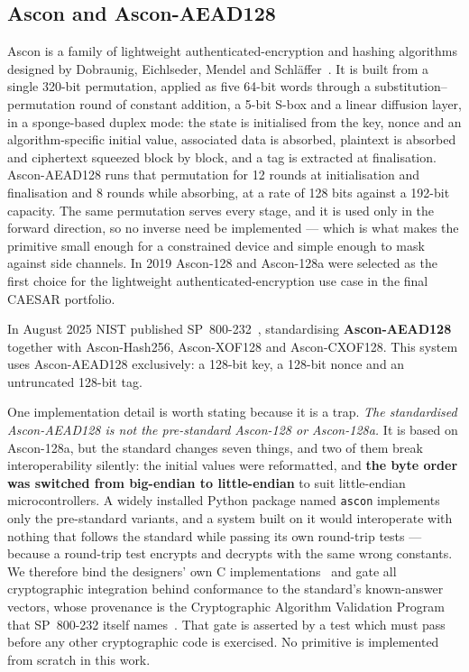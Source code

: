 \documentclass[conference]{IEEEtran}
\begin{document}
\subsection{Ascon and Ascon-AEAD128}\label{sec:ascon}
Ascon is a family of lightweight authenticated-encryption and hashing algorithms designed by
Dobraunig, Eichlseder, Mendel and Schl\"affer~\cite{dobraunig2021ascon}. It is built from a
single 320-bit permutation, applied as five 64-bit words through a substitution--permutation
round of constant addition, a 5-bit S-box and a linear diffusion layer, in a sponge-based duplex
mode: the state is initialised from the key, nonce and an algorithm-specific initial value,
associated data is absorbed, plaintext is absorbed and ciphertext squeezed block by block, and a
tag is extracted at finalisation. Ascon-AEAD128 runs that permutation for 12 rounds at
initialisation and finalisation and 8 rounds while absorbing, at a rate of 128 bits against a
192-bit capacity. The same permutation serves every stage, and it is used only in the forward
direction, so no inverse need be implemented --- which is what makes the primitive small enough
for a constrained device and simple enough to mask against side channels. In 2019 Ascon-128 and
Ascon-128a were selected as the first choice for the lightweight authenticated-encryption use
case in the final CAESAR portfolio.

In August 2025 NIST published SP~800-232~\cite{nist2025sp800232}, standardising
\textbf{Ascon-AEAD128} together with Ascon-Hash256, Ascon-XOF128 and Ascon-CXOF128. This system
uses Ascon-AEAD128 exclusively: a 128-bit key, a 128-bit nonce and an untruncated 128-bit tag.

One implementation detail is worth stating because it is a trap. \emph{The standardised
Ascon-AEAD128 is not the pre-standard Ascon-128 or Ascon-128a.} It is based on Ascon-128a, but
the standard changes seven things, and two of them break interoperability silently: the initial
values were reformatted, and \textbf{the byte order was switched from big-endian to
little-endian} to suit little-endian microcontrollers. A widely installed Python package named
\texttt{ascon} implements only the pre-standard variants, and a system built on it would
interoperate with nothing that follows the standard while passing its own round-trip tests ---
because a round-trip test encrypts and decrypts with the same wrong constants. We therefore bind
the designers' own C implementations~\cite{asconc} and gate all cryptographic integration behind
conformance to the standard's known-answer vectors, whose provenance is the Cryptographic
Algorithm Validation Program that SP~800-232 itself names~\cite{nistcavp}. That gate is asserted
by a test which must pass before any other cryptographic code is exercised. No primitive is
implemented from scratch in this work.
\end{document}
